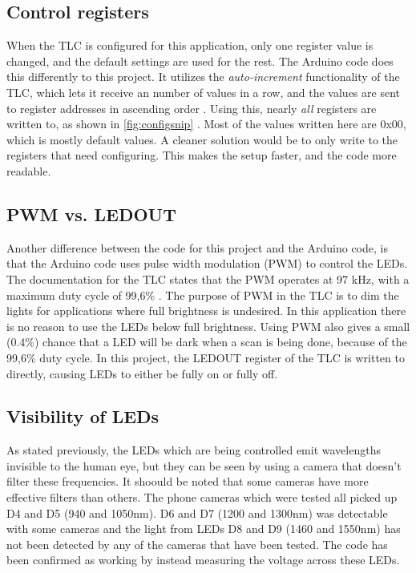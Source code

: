 \documentclass[12pt, a4paper]{article}
\begin{document}
    \subsection{Control registers}


    When the TLC is configured for this application, only one register value is changed, and the default settings are used for the rest.
    The Arduino code does this differently to this project. It utilizes the \textit{auto-increment} functionality of the TLC, which lets it receive an number of values in a row,
    and the values are sent to register addresses in ascending order \cite{tlc}. Using this, nearly \textit{all} registers are written to,
    as shown in \cref{fig:configsnip} \cite{arduinocode}. Most of the values written here are 0x00, which is mostly default values. A cleaner
    solution would be to only write to the registers that need configuring. This makes the setup faster, and the code more readable. 

    \subsection{PWM vs. LEDOUT}

    Another difference between the code for this project and the Arduino code, is that the Arduino code uses pulse width modulation (PWM) to
    control the LEDs. The documentation for the TLC states that the PWM operates at 97 kHz, with a maximum duty cycle of 99,6\% \cite{tlc}. The purpose
    of PWM in the TLC is to dim the lights for applications where full brightness is undesired. In this application there is no reason to
    use the LEDs below full brightness. Using PWM also gives a small (0.4\%) chance that a LED will be dark when a scan is being done, because of the 99,6\% duty cycle. In
    this project, the LEDOUT register of the TLC is written to directly, causing LEDs to either be fully on or fully off.

    \subsection{Visibility of LEDs}
    
    As stated previously, the LEDs which are being controlled emit wavelengths invisible to the human eye, but they can be seen by using a camera
    that doesn't filter these frequencies. It shoould be noted that some cameras have more effective filters than others.
    The phone cameras which were tested all picked up D4 and D5 (940 and 1050nm). D6 and D7 (1200 and 1300nm) was detectable with some cameras
    and the light from LEDs D8 and D9 (1460 and 1550nm) has not been detected by any of the cameras that have been tested. The code has been confirmed as working by instead measuring the voltage
    across these LEDs.
\end{document}
